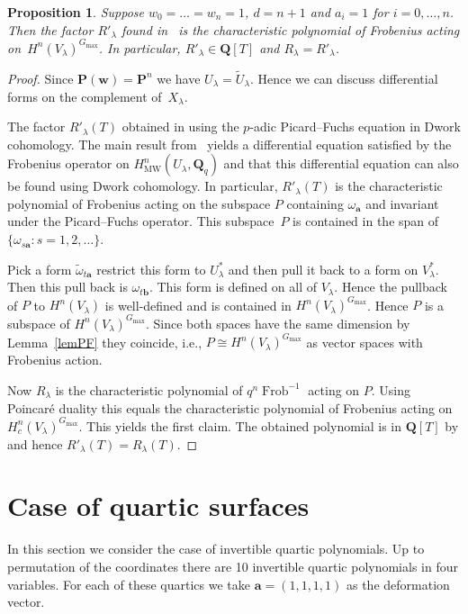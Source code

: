 \documentclass[pdftex]{sigma}
\numberwithin{equation}{section}
\newtheorem{Proposition}[Theorem]{Proposition}
 { \theoremstyle{definition}
\newtheorem{Definition}[Theorem]{Definition}
\newtheorem{notation}[Theorem]{Notation}
\newtheorem{Example}[Theorem]{Example}
\newtheorem{Remark}[Theorem]{Remark} }
\DeclareMathOperator{\MW}{MW}
\DeclareMathOperator{\Frob}{Frob}
\begin{document}
\begin{Proposition}\label{prpFactorDiv} Suppose $w_0=\dots=w_n=1$, $d=n+1$ and $a_i=1$ for $i=0,\dots,n$. Then the factor $R'_{\lambda}$ found in~{\rm \cite{DKSSVW}} is the characteristic polynomial of Frobenius acting on~$H^n(V_{\lambda})^{G_{\max}}$. In particular, $R'_{\lambda}\in \mathbf{Q}[T]$ and $R_\lambda=R'_\lambda$.
\end{Proposition}
\begin{proof} Since $\mathbf{P}(\mathbf{w})=\mathbf{P}^n$ we have $U_{\lambda}=\tilde{U}_\lambda$. Hence we can discuss dif\/ferential forms on the complement of~$X_{\lambda}$.

The factor $R'_\lambda(T)$ obtained in \cite{DKSSVW} using the $p$-adic Picard--Fuchs equation in Dwork coho\-mo\-logy. The main result from~\cite{Katz} yields a dif\/ferential equation satisf\/ied by the Frobenius operator on $H^n_{\MW}(U_\lambda,\mathbf{Q}_q)$ and that this dif\/ferential equation can also be found using Dwork cohomology. In particular, $R'_\lambda(T)$ is the characteristic polynomial of Frobenius acting on the subspace $P$ containing $\omega_{\mathbf{a}}$ and invariant under the Picard--Fuchs operator. This subspace~$P$ is contained in the span of~$\{\omega_{s\mathbf{a}} \colon s=1,2,\dots\}$.

Pick a form $\tilde{\omega}_{t\mathbf{a}}$ restrict this form to $U_{\lambda}^*$ and then pull it back to a form on $V_{\lambda}^*$. Then this pull back is $\omega_{t\mathbf{b}}$. This form is def\/ined on all of $V_{\lambda}$. Hence the pullback of $P$ to $H^n(V_{\lambda})$ is well-def\/ined and is contained in $H^n(V_{\lambda})^{G_{\max}}$. Hence $P$ is a subspace of $H^n(V_{\lambda})^{G_{\max}}$. Since both spaces have the same dimension by Lemma~\ref{lemPF} they coincide, i.e., $P\cong H^n(V_{\lambda})^{G_{\max}}$ as vector spaces with Frobenius action.

Now $R_{\lambda}$ is the characteristic polynomial of $q^n \Frob^{-1}$ acting on $P$. Using Poincar\'e duality this equals the characteristic polynomial of Frobenius acting on $H^n_c(V_\lambda)^{G_{\max}}$. This yields the f\/irst claim. The obtained polynomial is in $\mathbf{Q}[T]$ by \cite[Lemma~4.3]{Zetafamrec} and hence $R'_{\lambda}(T)=R_\lambda(T)$.
\end{proof}

\section{Case of quartic surfaces}\label{secQua}
In this section we consider the case of invertible quartic polynomials. Up to permutation of the coordinates there are 10 invertible quartic polynomials in four variables. For each of these quartics we take $\mathbf{a}=(1,1,1,1)$ as the deformation vector.
\end{document}
